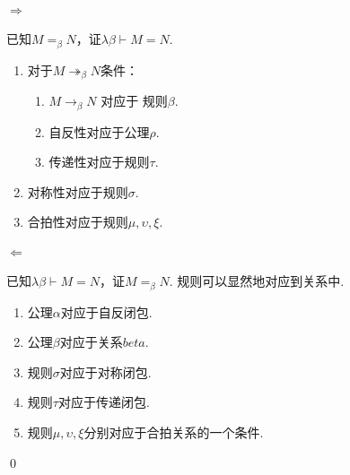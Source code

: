  \label{3.10}
\begin{pf} \rm \;  

\paragraph{$\Rightarrow$}\quad\quad 已知$M=_\beta N$，证$\lambda\beta\vdash M=N$. 

\begin{enumerate}
    \item 对于$M\twoheadrightarrow_\beta N$条件：
    \begin{enumerate}
        \item $M\rightarrow_\beta N$ 对应于 规则$\beta$.
        \item 自反性对应于公理$\rho$.
        \item 传递性对应于规则$\tau$.
    \end{enumerate}
    \item 对称性对应于规则$\sigma$.
    \item 合拍性对应于规则$\mu, \upsilon,\xi$.
\end{enumerate}

\paragraph{$\Leftarrow$}\quad\quad 已知$\lambda\beta\vdash M=N$，证$M=_\beta N$. 规则可以显然地对应到关系中.

\begin{enumerate}
    \item 公理$\alpha$对应于自反闭包.
    \item 公理$\beta$对应于关系$beta$.
    \item 规则$\sigma$对应于对称闭包.
    \item 规则$\tau$对应于传递闭包.
    \item 规则$\mu, \upsilon, \xi$分别对应于合拍关系的一个条件.
\end{enumerate}
    
    \qed 
\end{pf}